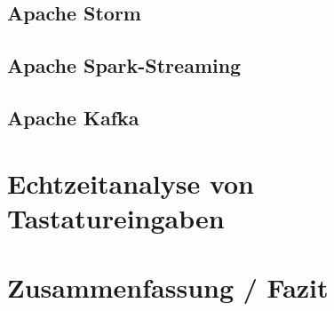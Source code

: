 \documentclass[a4paper,11pt]{scrartcl}
\begin{document}


  \subsection{Apache Storm}
  \subsection{Apache Spark-Streaming}
  \subsection{Apache Kafka}

  \section{Echtzeitanalyse von Tastatureingaben}


  \section{Zusammenfassung / Fazit}


  
\end{document}
